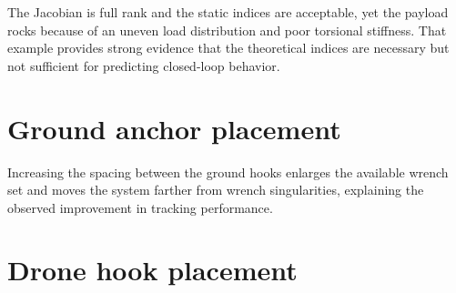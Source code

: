 

The Jacobian is full rank and the static indices are acceptable, yet the payload rocks because of an uneven load distribution and poor torsional stiffness. That example provides strong evidence that the theoretical indices are necessary but not sufficient for predicting closed-loop behavior.






\section{Ground anchor placement}
Increasing the spacing between the ground hooks enlarges the available wrench set and moves the system farther from wrench singularities, explaining the observed improvement in tracking performance.

\section{Drone hook placement}
\label{sec:dronehook}


